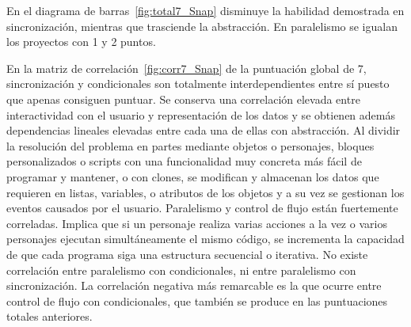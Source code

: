 \documentclass[a4paper, 12pt]{book}
\begin{document}
En el diagrama de barras~\ref{fig:total7_Snap} disminuye la habilidad demostrada en sincronización, mientras que trasciende la abstracción. En paralelismo se igualan los proyectos con 1 y 2 puntos.

En la matriz de correlación~\ref{fig:corr7_Snap} de la puntuación global de 7, sincronización y condicionales son totalmente interdependientes entre sí puesto que apenas consiguen puntuar. Se conserva una correlación elevada entre interactividad con el usuario y representación de los datos y se obtienen además dependencias lineales elevadas entre cada una de ellas con abstracción. Al dividir la resolución del problema en partes mediante objetos o personajes, bloques personalizados o scripts con una funcionalidad muy concreta más fácil de programar y mantener, o con clones, se modifican y almacenan los datos que requieren en listas, variables, o atributos de los objetos y a su vez se gestionan los eventos causados por el usuario. Paralelismo y control de flujo están fuertemente correladas. Implica que si un personaje realiza varias acciones a la vez o varios personajes ejecutan simultáneamente el mismo código, se incrementa la capacidad de que cada programa siga una estructura secuencial o iterativa. No existe correlación entre paralelismo con condicionales, ni entre paralelismo con sincronización. La correlación negativa más remarcable es la que ocurre entre control de flujo con condicionales, que también se produce en las puntuaciones totales anteriores. %
\end{document}
